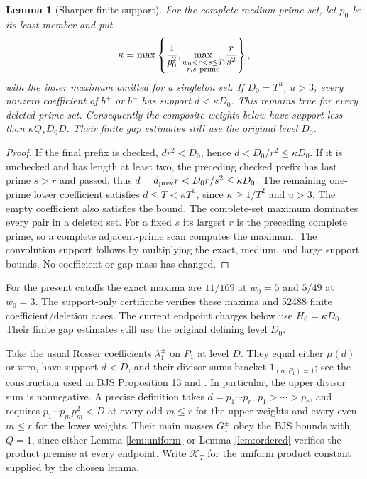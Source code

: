 \documentclass[11pt]{article}
\newtheorem{lemma}[theorem]{Lemma}
\begin{document}
\begin{lemma}[Sharper finite support]\label{lem:sharpsupport}
For the complete medium prime set, let $p_0$ be its least member and put
\[
\kappa=\max\left\{\frac1{p_0^2},
 \max_{\substack{w_0<r<s\le T\\r,s\ {\rm prime}}}\frac r{s^2}\right\},
\]
with the inner maximum omitted for a singleton set.
If $D_0=T^u$, $u>3$, every nonzero coefficient of $b^+$ or $b^-$
has support $d<\kappa D_0$. This remains true for every deleted
prime set. Consequently the composite weights below have support
less than $\kappa Q_*D_0D$.
Their finite gap estimates still use the original level $D_0$.
\end{lemma}
\begin{proof}
If the final prefix is checked, $dr^2<D_0$, hence
$d<D_0/r^2\le\kappa D_0$.
If it is unchecked and has length at least two, the preceding
checked prefix has last prime $s>r$ and passed; thus
$d=d_{\rm prev}r<D_0r/s^2\le\kappa D_0$.
The remaining one-prime lower coefficient satisfies
$d\le T<\kappa T^u$, since $\kappa\ge1/T^2$ and $u>3$.
The empty coefficient also satisfies the bound.
The complete-set maximum dominates every pair in a deleted set.
For a fixed $s$ its largest $r$ is the preceding complete prime,
so a complete adjacent-prime scan computes the maximum.
The convolution support follows by multiplying the exact, medium,
and large support bounds. No coefficient or gap mass has changed.
\end{proof}
For the present cutoffs the exact maxima are $11/169$ at $w_0=5$
and $5/49$ at $w_0=3$. The support-only certificate verifies these
maxima and 52488 finite coefficient/deletion cases. The current
endpoint charges below use $H_0=\kappa D_0$. Their finite gap
estimates still use the original defining level $D_0$.

Take the usual Rosser coefficients $\lambda_1^\pm$ on $P_1$ at
level $D$. They equal either $\mu(d)$ or zero, have support $d<D$,
and their divisor sums bracket $1_{(n,P_1)=1}$; see the construction
used in BJS Proposition 13 and \cite[Theorem 9.3]{Nathanson}. In particular,
the upper divisor sum is nonnegative. A precise definition takes
$d=p_1\cdots p_r$, $p_1>\cdots>p_r$, and requires
$p_1\cdots p_m p_m^2<D$ at every odd $m\le r$ for the upper
weights and every even $m\le r$ for the lower weights.
Their main masses $G_1^\pm$ obey the BJS bounds with $Q=1$, since
either Lemma \ref{lem:uniform} or Lemma \ref{lem:ordered} verifies the
product premise at every endpoint. Write $\mathcal K_T$ for the
uniform product constant supplied by the chosen lemma.
\end{document}
